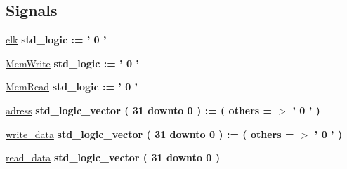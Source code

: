 \subsection*{\-Signals}
 \begin{DoxyCompactItemize}
\item 
\hyperlink{classdata__memory__tb_1_1behavior_a02e01e59b5f6f9ed85c3e44abcd3d3b0}{clk} {\bfseries std\-\_\-logic  \-:= '  0  ' } 
\item 
\hyperlink{classdata__memory__tb_1_1behavior_a721e0bf40b8b405a548bc525862a7c92}{\-Mem\-Write} {\bfseries std\-\_\-logic  \-:= '  0  ' } 
\item 
\hyperlink{classdata__memory__tb_1_1behavior_a2c9243ab9101de83bddc0c7339542554}{\-Mem\-Read} {\bfseries std\-\_\-logic  \-:= '  0  ' } 
\item 
\hyperlink{classdata__memory__tb_1_1behavior_ad00e55d610ace0812e82bd88e7bfc072}{adress} {\bfseries std\-\_\-logic\-\_\-vector (   31    downto    0  )  \-:= (  others  = $>$ '  0  '  ) } 
\item 
\hyperlink{classdata__memory__tb_1_1behavior_a132a1487bc7afa2de397e2c6f1b4f576}{write\-\_\-data} {\bfseries std\-\_\-logic\-\_\-vector (   31    downto    0  )  \-:= (  others  = $>$ '  0  '  ) } 
\item 
\hyperlink{classdata__memory__tb_1_1behavior_a0ffc759f5a888e5c7c7b770e1d0829a8}{read\-\_\-data} {\bfseries std\-\_\-logic\-\_\-vector (   31    downto    0  ) } 
\end{DoxyCompactItemize}



